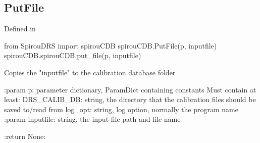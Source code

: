 \noindent\begin{minipage}{\textwidth}
\subsection{PutFile}

Defined in \spirouCDB{}

\begin{pythonbox}
from SpirouDRS import spirouCDB
spirouCDB.PutFile(p, inputfile)
spirouCDB.spirouCDB.put_file(p, inputfile)
\end{pythonbox}

\begin{pythondocstring}
Copies the "inputfile" to the calibration database folder

:param p: parameter dictionary, ParamDict containing constants
    Must contain at least:
            DRS_CALIB_DB: string, the directory that the calibration
                          files should be saved to/read from
            log_opt: string, log option, normally the program name
:param inputfile: string, the input file path and file name

:return None:
\end{pythondocstring}
\end{minipage}

